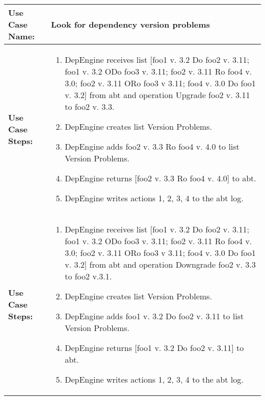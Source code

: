 
\begin{tabularx}{\linewidth}{|l|X|}
\hline
\textbf{Use Case Name:} & \textbf{Look for dependency version problems} \\
\hline
\textbf{Use Case Steps:} & 
\begin{minipage}{\linewidth} 
  \vspace{0.05em}
  \begin{enumerate}
  \item DepEngine receives list [foo1 v. 3.2 Do foo2 v. 3.11; foo1 v. 3.2 ODo foo3 v. 3.11; foo2 v. 3.11 Ro foo4 v. 3.0; foo2 v. 3.11 ORo foo3 v 3.11; foo4 v. 3.0 Do foo1 v. 3.2] from abt and operation Upgrade foo2 v. 3.11 to foo2 v. 3.3.
  \item DepEngine creates list Version Problems.
  \item DepEngine adds foo2 v. 3.3 Ro foo4 v. 4.0 to list Version Problems.
  \item DepEngine returns [foo2 v. 3.3 Ro foo4 v. 4.0] to abt.
  \item DepEngine writes actions 1, 2, 3, 4 to the abt log.
    \end{enumerate}
  \vspace{0.05em}
\end{minipage}
\\
\hline 
\textbf{Use Case Steps:} & 
\begin{minipage}{\linewidth} 
  \vspace{0.05em}
  \begin{enumerate}
  \item DepEngine receives list [foo1 v. 3.2 Do foo2 v. 3.11; foo1 v. 3.2 ODo foo3 v. 3.11; foo2 v. 3.11 Ro foo4 v. 3.0; foo2 v. 3.11 ORo foo3 v 3.11; foo4 v. 3.0 Do foo1 v. 3.2] from abt and operation Downgrade foo2 v. 3.3 to foo2 v.3.1.
  \item DepEngine creates list Version Problems.
  \item DepEngine adds foo1 v. 3.2 Do foo2 v. 3.11 to list Version Problems.
  \item DepEngine returns [foo1 v. 3.2 Do foo2 v. 3.11] to abt.
  \item DepEngine writes actions 1, 2, 3, 4 to the abt log.
    \end{enumerate}
  \vspace{0.05em}
\end{minipage}
\\
\hline 
\end{tabularx}
